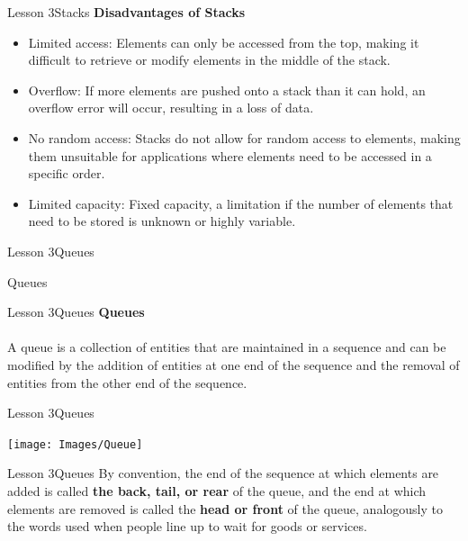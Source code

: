 \documentclass[aspectratio=1610]{beamer}
\begin{document}
\begin{frame}{Lesson 3}{Stacks}
\LARGE
\textbf{Disadvantages of Stacks}\\
\Large
\begin{itemize}
\item Limited access: Elements can only be accessed from the top, making it difficult to retrieve or modify elements in the middle of the stack.
\item Overflow: If more elements are pushed onto a stack than it can hold, an overflow error will occur, resulting in a loss of data.
\item No random access: Stacks do not allow for random access to elements, making them unsuitable for applications where elements need to be accessed in a specific order.
\item Limited capacity: Fixed capacity, a limitation if the number of elements that need to be stored is unknown or highly variable.
\end{itemize}
\end{frame}



\begin{frame}{Lesson 3}{Queues}
\begin{center}
\Huge Queues
\end{center}
\end{frame}


\begin{frame}{Lesson 3}{Queues}
\LARGE
\textbf{Queues}\\~\\
A queue is a collection of entities that are maintained in
a sequence and can be modified by the addition of entities at one
end of the sequence and the removal of entities from the other end
of the sequence. 
\end{frame}


\begin{frame}{Lesson 3}{Queues}
\begin{center}
\texttt{[image: Images/Queue]}
\end{center}
\end{frame}


\begin{frame}{Lesson 3}{Queues}
\LARGE
By convention, the end of the sequence at which elements are added
is called \textbf{the back, tail, or rear} of the queue, and the end
at which elements are removed is called the \textbf{head or front}
of the queue, analogously to the words used when people line up to
wait for goods or services.
\end{frame}
\end{document}

